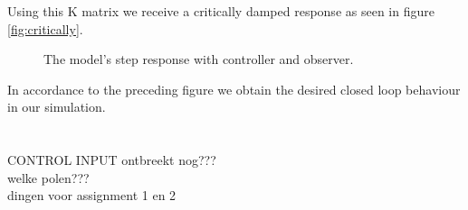 \documentclass[final]{scrreprt} %
\begin{document}
Using this K matrix we receive a critically damped response as seen in figure \ref{fig:critically}.

\begin{figure}[H]
	\centering
    	\setlength\figureheight{4cm}
    	\setlength{}
    	    	
    	\caption{The model’s step response with controller and observer.}
    	\label{fig:crittically}
\end{figure}

In accordance to the preceding figure we obtain the desired closed loop behaviour in our simulation.\\\\
\\
CONTROL INPUT ontbreekt nog???\\
welke polen???\\
dingen voor assignment 1 en 2\\
\end{document}

